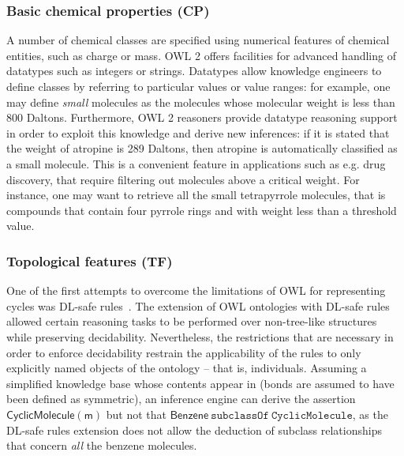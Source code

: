 \documentclass[10pt]{bmc_article}
\newenvironment{bmcformat}{\baselineskip20pt\sloppy\setboolean{publ}{false}}{\baselineskip20pt\sloppy}
\begin{document}
\begin{bmcformat}
\subsubsection*{Basic chemical properties (CP)}

A number of chemical classes are specified using numerical features of chemical entities, such as charge or mass. OWL 2
offers facilities for advanced handling of datatypes such as integers or strings. Datatypes allow knowledge engineers to define classes by referring to particular values or value ranges: for example, one may define \emph{small} molecules as the molecules whose molecular weight is less than 800 Daltons. 
Furthermore, OWL 2 reasoners provide datatype reasoning support~\cite{Motik2008} in order to exploit this knowledge and derive new inferences: if it is stated that the weight of atropine is 289 Daltons, then atropine is automatically classified as a small molecule. 
This is a convenient feature in applications such as e.g. drug discovery, that require filtering out molecules above a critical weight. For instance, one may want to retrieve all the small tetrapyrrole molecules, that is compounds that contain four pyrrole rings and with weight less than a threshold value.%

\subsubsection*{Topological features (TF)}
\label{subsubsec:cycles}

One of the first attempts to overcome the limitations of OWL for representing cycles was DL-safe rules~\cite{DLSafeBoris}. The extension of OWL ontologies with DL-safe rules allowed certain reasoning tasks to be performed over non-tree-like structures while preserving decidability. Nevertheless, the restrictions that are necessary in order to enforce decidability restrain the applicability of the rules to only explicitly named objects of the ontology -- that is, individuals. Assuming a simplified knowledge base whose contents appear in \textit{} (bonds are assumed to have been defined as symmetric), %
an inference engine can derive the assertion $\mathsf{CyclicMolecule(m)}$ but not that $\mathsf{Benzene} ~\texttt{subclassOf} ~\texttt{CyclicMolecule}$, as the DL-safe rules extension does not allow the deduction of subclass relationships that concern \emph{all} the benzene molecules. 


\end{bmcformat}
\end{document}
